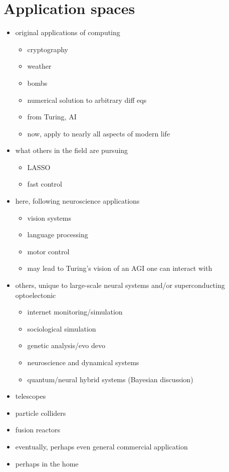 \section{\label{sec:applications}Application spaces}

\begin{itemize}
\item original applications of computing
\begin{itemize}
\item cryptography
\item weather
\item bombs
\item numerical solution to arbitrary diff eqs
\item from Turing, AI
\item now, apply to nearly all aspects of modern life
\end{itemize}
\item what others in the field are pursuing
\begin{itemize}
\item LASSO \cite{dasr2018}
\item fast control \cite{prsh2017}
\end{itemize}
\item here, following neuroscience applications 
\begin{itemize}
\item vision systems
\item language processing
\item motor control
\item may lead to Turing's vision of an AGI one can interact with
\end{itemize}
\item others, unique to large-scale neural systems and/or superconducting optoelectonic
\begin{itemize}
\item internet monitoring/simulation
\item sociological simulation
\item genetic analysis/evo devo
\item neuroscience and dynamical systems
\item quantum/neural hybrid systems (Bayesian discussion)
\end{itemize}
\end{itemize}

\begin{itemize}
\item telescopes
\item particle colliders
\item fusion reactors
\item eventually, perhaps even general commercial application
\item perhaps in the home
\end{itemize}

